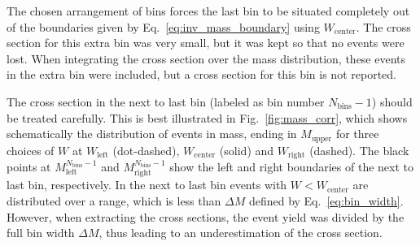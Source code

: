 \documentclass[prc,twocolumn,superscriptaddress,showpacs,amssymb,amsmath,amsfonts,aps,nofootinbib]{revtex4-1}
\begin{document}
The chosen arrangement of bins forces the last bin to be situated completely out of the boundaries given by Eq.~\eqref{eq:inv_mass_boundary} using $W_{\text{center}}$.
The cross section 
for this extra bin was very small, but it was kept so that no 
events were lost. When integrating the cross section over the 
mass distribution, these events in the extra bin were included, 
but a cross section for this bin is not reported.

The cross section in the next to last bin (labeled as bin number 
$N_{\text{bins}}-1$) should be treated carefully.
This is best illustrated in Fig.~\ref{fig:mass_corr}, which shows schematically the 
distribution of events in mass, ending in $M_{\text{upper}}$ for three 
choices of $W$ at $W_{\text{left}}$ (dot-dashed), $W_{\text{center}}$ (solid) and 
$W_{\text{right}}$ (dashed).
The black points at $M_{\text{left}}^{N_{\text{bins}}-1}$ and $M_{\text{right}}^{N_{\text{bins}}-1}$ show the left and right boundaries of the next to last bin, respectively. In the next to last bin events with $W < W_{\text{center}}$ are 
distributed over a range, which is less than $\Delta M$ defined by Eq.~\eqref{eq:bin_width}.
However, when extracting the cross sections, the event yield was divided by the full bin width $\Delta M$, thus leading to an underestimation of the cross section.

\end{document}
